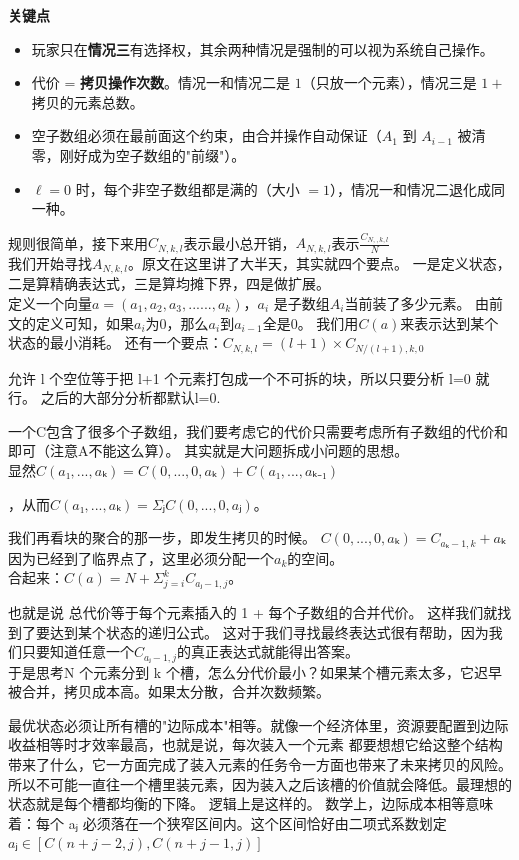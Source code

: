 \documentclass[12pt,a4paper]{article}
\begin{document}
\textbf{关键点}
\begin{itemize}[nosep]
    \item 玩家只在\textbf{情况三}有选择权，其余两种情况是强制的可以视为系统自己操作。
    \item 代价 = \textbf{拷贝操作次数}。情况一和情况二是 $1$（只放一个元素），情况三是 $1 + {}$拷贝的元素总数。
    \item 空子数组必须在最前面这个约束，由合并操作自动保证（$A_1$ 到 $A_{i-1}$ 被清零，刚好成为空子数组的"前缀"）。
    \item $\ell = 0$ 时，每个非空子数组都是满的（大小 $=1$），情况一和情况二退化成同一种。
\end{itemize}
规则很简单，接下来用$C_{N,k,l}$表示最小总开销，$A_{N,k,l}$表示$\frac{C_{N,,k,l}}{N}$\\
我们开始寻找$A_{N,k,l}$。原文在这里讲了大半天，其实就四个要点。
一是定义状态，二是算精确表达式，三是算均摊下界，四是做扩展。\\
定义一个向量$a=(a_1,a_2,a_3,......,a_k)$，$a_i$
是子数组$A_i$当前装了多少元素。
由前文的定义可知，如果$a_i$为0，那么$a_i$到$a_{i-1}$全是0。
我们用$C(a)$来表示达到某个状态的最小消耗。
还有一个要点：$C_{N,k,l} = (l+1) \times C_{N/(l+1), k, 0}$

允许 l 个空位等于把 l+1 个元素打包成一个不可拆的块，所以只要分析 l=0 就行。
之后的大部分分析都默认l=0.



一个C包含了很多个子数组，我们要考虑它的代价只需要考虑所有子数组的代价和即可（注意A不能这么算）。
其实就是大问题拆成小问题的思想。\\
显然$C(a₁,...,aₖ) = C(0,...,0, aₖ) + C(a₁,...,aₖ₋₁)$


，从而$C(a₁,...,aₖ) = Σⱼ C(0,...,0, aⱼ)$。

我们再看块的聚合的那一步，即发生拷贝的时候。
$C(0,...,0, aₖ) = C_{aₖ-1, k} + aₖ$因为已经到了临界点了，这里必须分配一个$a_k$的空间。\\




合起来：$C(a) = N + Σ_{j=i}^{k} C_{aⱼ-1, j}$。

也就是说
总代价等于每个元素插入的 1 + 每个子数组的合并代价。
这样我们就找到了要达到某个状态的递归公式。
这对于我们寻找最终表达式很有帮助，因为我们只要知道任意一个$C_{aⱼ-1, j}$的真正表达式就能得出答案。\\
于是思考N 个元素分到 k 个槽，怎么分代价最小？如果某个槽元素太多，它迟早被合并，拷贝成本高。如果太分散，合并次数频繁。

最优状态必须让所有槽的"边际成本"相等。就像一个经济体里，资源要配置到边际收益相等时才效率最高，也就是说，每次装入一个元素
都要想想它给这整个结构带来了什么，它一方面完成了装入元素的任务令一方面也带来了未来拷贝的风险。
所以不可能一直往一个槽里装元素，因为装入之后该槽的价值就会降低。最理想的状态就是每个槽都均衡的下降。
逻辑上是这样的。
数学上，边际成本相等意味着：每个 aⱼ 必须落在一个狭窄区间内。这个区间恰好由二项式系数划定
$aⱼ ∈ [ C(n+j-2, j), C(n+j-1, j) ]$
\end{document}
